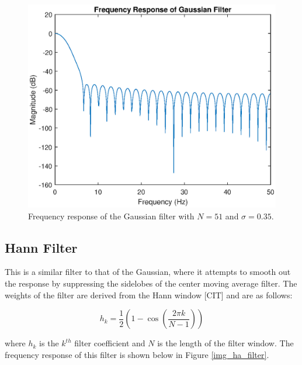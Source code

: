                 \begin{figure}[!th]
                    \includegraphics[width=\textwidth]{Images/ga_filter.eps}
                    \centering
                    \caption{Frequency response of the Gaussian filter with $N=51$ and $\sigma = 0.35$.}
                    \label{img_ga_filter}
                \end{figure}

            \subsection{Hann Filter}

                This is a similar filter to that of the Gaussian, where it attempts to smooth out the response by suppressing the sidelobes of the center moving average filter. The weights of the filter are derived from the Hann window [CIT] and are as follows: 

                \begin{equation}
                    h_k = \frac{1}{2}(1 - \cos(\frac{2\pi k}{N - 1}))
                \end{equation}

                where $h_k$ is the $k^{th}$ filter coefficient and $N$ is the length of the filter window. The frequency response of this filter is shown below in Figure \ref{img_ha_filter}.

